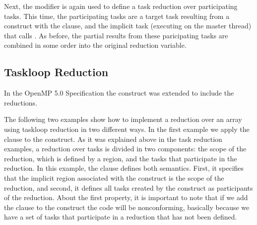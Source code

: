 

Next, the  modifier is again used to define a task reduction over
participating tasks. This time, the participating tasks are a target task
resulting from a  construct with the  clause,
and the implicit task (executing on the master thread) that calls
. As before, the partial results from these paricipating
tasks are combined in some order into the original reduction variable.




\subsection{Taskloop Reduction}
\label{subsec:taskloop_reduction}

In the OpenMP 5.0 Specification the  construct
was extended to include the reductions.

The following two examples show how to implement a reduction over an array
using taskloop reduction in two different ways.
In the first
example we apply the  clause to the  construct. As it was
explained above in the task reduction examples, a reduction over tasks is
divided in two components: the scope of the reduction, which is defined by a
 region, and the tasks that participate in the reduction. In this
example, the  clause defines both semantics. First, it specifies that
the implicit  region associated with the  construct is the scope of the
reduction, and second, it defines all tasks created by the  construct as
participants of the reduction. About the first property, it is important to note
that if we add the  clause to the  construct the code will be
nonconforming, basically because we have a set of tasks that participate in a
reduction that has not been defined.


